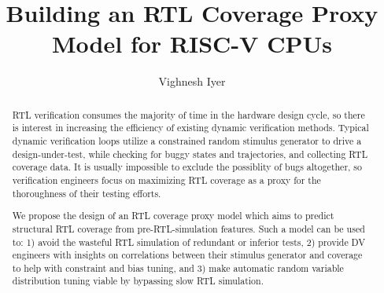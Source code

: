 \documentclass[sigconf,noacm]{acmart}
\begin{document}
\title{Building an RTL Coverage Proxy Model for RISC-V CPUs}

\author{Vighnesh Iyer}

\renewcommand{\shortauthors}{Vighnesh Iyer}

\begin{abstract}
RTL verification consumes the majority of time in the hardware design cycle, so there is interest in increasing the efficiency of existing dynamic verification methods.
Typical dynamic verification loops utilize a constrained random stimulus generator to drive a design-under-test, while checking for buggy states and trajectories, and collecting RTL coverage data.
It is usually impossible to exclude the possiblity of bugs altogether, so verification engineers focus on maximizing RTL coverage as a proxy for the thoroughness of their testing efforts.

We propose the design of an RTL coverage proxy model which aims to predict structural RTL coverage from pre-RTL-simulation features.
Such a model can be used to: 1) avoid the wasteful RTL simulation of redundant or inferior tests, 2) provide DV engineers with insights on correlations between their stimulus generator and coverage to help with constraint and bias tuning, and 3) make automatic random variable distribution tuning viable by bypassing slow RTL simulation.





\end{abstract}
\end{document}
